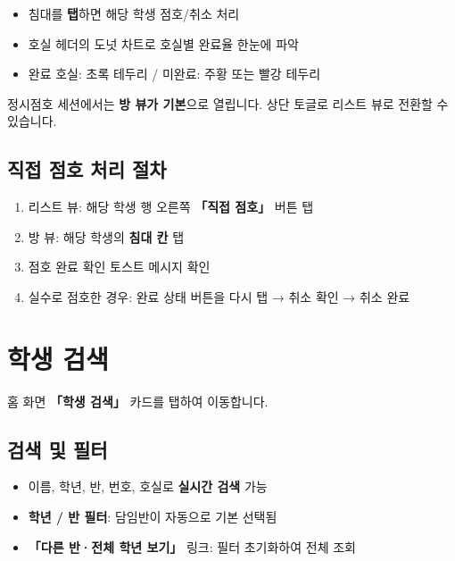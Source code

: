 \documentclass[a4paper,11pt]{article}
\begin{document}
\begin{itemize}
  \item 침대를 \textbf{탭}하면 해당 학생 점호/취소 처리
  \item 호실 헤더의 도넛 차트로 호실별 완료율 한눈에 파악
  \item 완료 호실: 초록 테두리 / 미완료: 주황 또는 빨강 테두리
\end{itemize}

\begin{tcolorbox}[tipbox]
정시점호 세션에서는 \textbf{방 뷰가 기본}으로 열립니다. 상단 토글로 리스트 뷰로 전환할 수 있습니다.
\end{tcolorbox}

\subsection{직접 점호 처리 절차}

\begin{tcolorbox}[stepbox]
\begin{enumerate}
  \item 리스트 뷰: 해당 학생 행 오른쪽 \textbf{「직접 점호」} 버튼 탭
  \item 방 뷰: 해당 학생의 \textbf{침대 칸} 탭
  \item 점호 완료 확인 토스트 메시지 확인
  \item 실수로 점호한 경우: 완료 상태 버튼을 다시 탭 → 취소 확인 → 취소 완료
\end{enumerate}
\end{tcolorbox}

\section{학생 검색}

홈 화면 \textbf{「학생 검색」} 카드를 탭하여 이동합니다.

\subsection{검색 및 필터}

\begin{itemize}
  \item 이름, 학년, 반, 번호, 호실로 \textbf{실시간 검색} 가능
  \item \textbf{학년 / 반 필터}: 담임반이 자동으로 기본 선택됨
  \item \textbf{「다른 반·전체 학년 보기」} 링크: 필터 초기화하여 전체 조회
\end{itemize}
\end{document}
